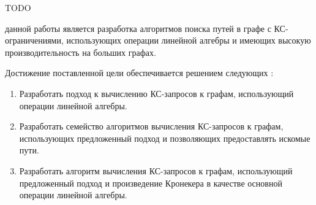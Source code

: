 

{\progress}
TODO

{\aim} данной работы является разработка алгоритмов поиска путей в графе с КС-ограничениями, использующих операции линейной алгебры и имеющих высокую производительность на больших графах.

Достижение поставленной цели обеспечивается решением следующих {\tasks}:
\begin{enumerate}[beginpenalty=10000] %
  \item Разработать подход к вычислению КС-запросов к графам, использующий операции линейной алгебры.
  \item Разработать семейство алгоритмов вычисления КС-запросов к графам, использующих предложенный подход и позволяющих предоставлять искомые пути.
  \item Разработать алгоритм вычисления КС-запросов к графам, использующий предложенный подход и произведение Кронекера в качестве основной операции линейной алгебры.
\end{enumerate}


